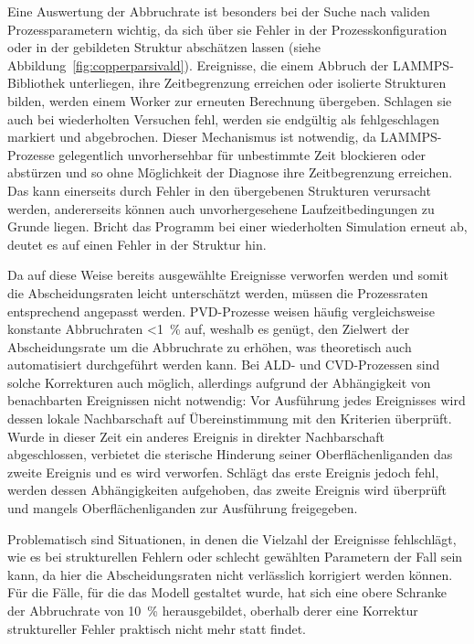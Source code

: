 Eine Auswertung der Abbruchrate ist besonders bei der Suche nach validen Prozessparametern wichtig, da sich über sie Fehler in der Prozesskonfiguration oder in der gebildeten Struktur abschätzen lassen (siehe Abbildung~\ref{fig:copperparsivald}).
Ereignisse, die einem Abbruch der LAMMPS-Bibliothek unterliegen, ihre Zeitbegrenzung erreichen oder isolierte Strukturen bilden, werden einem Worker zur erneuten Berechnung übergeben.
Schlagen sie auch bei wiederholten Versuchen fehl, werden sie endgültig als fehlgeschlagen markiert und abgebrochen.
Dieser Mechanismus ist notwendig, da LAMMPS-Prozesse gelegentlich unvorhersehbar für unbestimmte Zeit blockieren oder abstürzen und so ohne Möglichkeit der Diagnose ihre Zeitbegrenzung erreichen.
Das kann einerseits durch Fehler in den übergebenen Strukturen verursacht werden, andererseits können auch unvorhergesehene Laufzeitbedingungen zu Grunde liegen.
Bricht das Programm bei einer wiederholten Simulation erneut ab, deutet es auf einen Fehler in der Struktur hin.

Da auf diese Weise bereits ausgewählte Ereignisse verworfen werden und somit die Abscheidungsraten leicht unterschätzt werden, müssen die Prozessraten entsprechend angepasst werden.
PVD-Prozesse weisen häufig vergleichsweise konstante Abbruchraten \SI{<1}{\percent} auf, weshalb es genügt, den Zielwert der Abscheidungsrate um die Abbruchrate zu erhöhen, was theoretisch auch automatisiert durchgeführt werden kann.
Bei ALD- und CVD-Prozessen sind solche Korrekturen auch möglich, allerdings aufgrund der Abhängigkeit von benachbarten Ereignissen nicht notwendig:
Vor Ausführung jedes Ereignisses wird dessen lokale Nachbarschaft auf Übereinstimmung mit den Kriterien überprüft.
Wurde in dieser Zeit ein anderes Ereignis in direkter Nachbarschaft abgeschlossen, verbietet die sterische Hinderung seiner Oberflächenliganden das zweite Ereignis und es wird verworfen.
Schlägt das erste Ereignis jedoch fehl, werden dessen Abhängigkeiten aufgehoben, das zweite Ereignis wird überprüft und mangels Oberflächenliganden zur Ausführung freigegeben.

Problematisch sind Situationen, in denen die Vielzahl der Ereignisse fehlschlägt, wie es bei strukturellen Fehlern oder schlecht gewählten Parametern der Fall sein kann, da hier die Abscheidungsraten nicht verlässlich korrigiert werden können.
Für die Fälle, für die das Modell gestaltet wurde, hat sich eine obere Schranke der Abbruchrate von \SI{10}{\percent} herausgebildet, oberhalb derer eine Korrektur struktureller Fehler praktisch nicht mehr statt findet.
